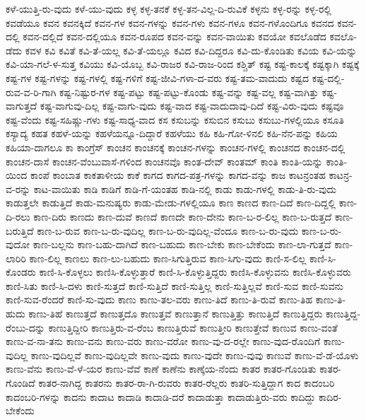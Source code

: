 {ಕಳೆ-ಯುತ್ತಿ-ರು-ವುದು
ಕಳೆ-ಯು-ವುದು
ಕಳ್ಳ
ಕಳ್ಳ-ತನಕೆ
ಕಳ್ಳ-ತನ-ವಿಲ್ಲ-ದಿ-ರುವಿಕೆ
ಕಳ್ಳನು
ಕಳ್ಳ-ರನ್ನು
ಕಳ್ಳ-ರಲ್ಲಿ
ಕವಡೆಯೂ
ಕವನ
ಕವನಕ್ಕಿದೆ
ಕವನ-ಗಳ
ಕವನ-ಗಳನ್ನು
ಕವನ-ಗಳು
ಕವನ-ಗಳೂ
ಕವನ-ಗಳೊಂದಿಗೂ
ಕವನದ
ಕವನ-ದಲ್ಲಿ
ಕವನ-ದಲ್ಲಿದೆ
ಕವನ-ದಲ್ಲಿಯೂ
ಕವನ-ರೂಪದ
ಕವನ-ವನ್ನು
ಕವನ-ವಾಯಿತು
ಕವಯೋ
ಕವಲೊಡೆದ
ಕವಲೊ-ಡೆದು
ಕವಳ
ಕವಿ
ಕವಿತೆ
ಕವಿ-ತೆ-ಯಲ್ಲ
ಕವಿ-ತೆ-ಯಲ್ಲೂ
ಕವಿದ
ಕವಿ-ದಿದ್ದರೂ
ಕವಿ-ದು-ಕೊಂಡಿತು
ಕವಿಯ
ಕವಿ-ಯನ್ನು
ಕವಿ-ಯಾ-ಗಲೆ-ಳ-ಸುತ್ತ
ಕವಿಯು
ಕವಿ-ಯೊಬ್ಬ
ಕವಿ-ರಾಜರ
ಕವಿ-ರಾಜ-ರಿಂದ
ಕಶ್ಚಿತ್
ಕಷ್ಟ
ಕಷ್ಟ-ಕಾಲಕ್ಕೆ
ಕಷ್ಟಕ್ಕಾಗಿ
ಕಷ್ಟಕ್ಕೆ
ಕಷ್ಟ-ಗಳ
ಕಷ್ಟ-ಗಳನ್ನು
ಕಷ್ಟ-ಗಳಲ್ಲಿ
ಕಷ್ಟ-ಗಳಿಗೆ
ಕಷ್ಟ-ಜೀವಿ-ಗಳಾ-ದ-ವರು
ಕಷ್ಟ-ತಮ-ವಾದುದು
ಕಷ್ಟದ
ಕಷ್ಟ-ದಲ್ಲಿ-ರುವ-ವ-ರಿ-ಗಾಗಿ
ಕಷ್ಟ-ನಿಷ್ಟುರ-ಗಳ
ಕಷ್ಟ-ಪಟ್ಟು
ಕಷ್ಟ-ಪಟ್ಟು-ಕೊಂಡು
ಕಷ್ಟ-ವನ್ನು
ಕಷ್ಟ-ವಲ್ಲ
ಕಷ್ಟ-ವಾಗಿತ್ತು
ಕಷ್ಟ-ವಾಗುತ್ತದೆ
ಕಷ್ಟ-ವಾಗುವು-ದಿಲ್ಲ
ಕಷ್ಟ-ವಾಗು-ವುದು
ಕಷ್ಟ-ವಾದ
ಕಷ್ಟ-ವಾದುದಾವು-ದಿದೆ
ಕಷ್ಟ-ವಿರು-ವುದು
ಕಷ್ಟವೂ
ಕಷ್ಟ-ವೆಂದು
ಕಷ್ಟ-ಸಹಿಷ್ಣು-ಗಳು
ಕಷ್ಟ-ಸಾಧ್ಯ-ವಾದ
ಕಸ
ಕಸುಬನ್ನು
ಕಸುಬಿನ
ಕಸುಬು
ಕಸುಬು-ಗಳಲ್ಲಿಯೂ
ಕಸೂತಿ
ಕಸ್ಯಾದ್ಯ
ಕಹತ
ಕಹಳೆ-ಯನ್ನು
ಕಹಳೆಯನ್ನೂ-ದಿದ್ದಾರೆ
ಕಹಳೆಯು
ಕಹಿ
ಕಹಿ-ಗೋ-ಳಿನಲಿ
ಕಹಿ-ನೆನ-ಪನ್ನು
ಕಹಿಯ
ಕಹಿಯಾ-ದಾಗಲೂ
ಕಾ
ಕಾಂಗ್ರೆಸ್
ಕಾಂಚನ
ಕಾಂಚನಕ್ಕೆ
ಕಾಂಚನ-ಗಳನ್ನು
ಕಾಂಚನ-ಗಳಲ್ಲಿ
ಕಾಂಚನದ
ಕಾಂಚನ-ದಲ್ಲಿ
ಕಾಂಚನ-ದಾಸೆ
ಕಾಂಚನ-ವೆಂಬುವಾಸೆ-ಗಳಿಂದ
ಕಾಂಚನವೊ
ಕಾಂತ-ದೇವ್
ಕಾಂತಮ್
ಕಾಂತಿ
ಕಾಂತಿ-ಯನ್ನು
ಕಾಂತಿ-ಯಿಂದ
ಕಾಂಪೆ
ಕಾಂಬಾತ
ಕಾಕತಾಳೀಯ
ಕಾಕೆ
ಕಾಗದ
ಕಾಗದ-ಪತ್ರ-ಗಳನ್ನು
ಕಾಗದ-ವನ್ನು
ಕಾಜ
ಕಾಟನ್ರಂತಹ
ಕಾಟನ್ರ-ವ-ರನ್ನು
ಕಾಟ-ವಾಯಿತು
ಕಾಡಿ
ಕಾಡಿಗೆ
ಕಾಡಿ-ಗೆ-ಯಂತಹ
ಕಾಡಿ-ನಲ್ಲಿ
ಕಾಡು
ಕಾಡು-ಗಳಲ್ಲಿ
ಕಾಡು-ತಿ-ರು-ವುದು
ಕಾಡುತ್ತಲೇ
ಕಾಡುತ್ತಿದೆ
ಕಾಡು-ಮನುಷ್ಯರು
ಕಾಡು-ಮೇಡು-ಗಳಲ್ಲಿಯೂ
ಕಾಣ
ಕಾಣದ
ಕಾಣ-ದಿದೆ
ಕಾಣ-ದಿದ್ದಲ್ಲಿ
ಕಾಣ-ದಿ-ರಲು
ಕಾಣ-ದಿರು
ಕಾಣದು
ಕಾಣ-ದುವೆ
ಕಾಣದೆ
ಕಾಣದೇ
ಕಾಣ-ದೇನು
ಕಾಣ-ಬ-ರ-ಲಿಲ್ಲ
ಕಾಣ-ಬ-ರುತ್ತದೆ
ಕಾಣ-ಬರುತ್ತಿದೆ
ಕಾಣ-ಬ-ರುವ
ಕಾಣ-ಬ-ರು-ವುದಿಲ್ಲ
ಕಾಣ-ಬ-ರು-ವುದಿಲ್ಲ-ವೆಂದೂ
ಕಾಣ-ಬ-ರು-ವುದು
ಕಾಣ-ಬ-ರು-ವುದೋ
ಕಾಣ-ಬಲ್ಲನು
ಕಾಣ-ಬಹು-ದಾಗಿದೆ
ಕಾಣ-ಬಹುದು
ಕಾಣ-ಬೇಕು
ಕಾಣ-ಬೇಕೆಂದು
ಕಾಣ-ಲಾ-ಗುತ್ತದೆ
ಕಾಣ-ಲಾರಿರಿ
ಕಾಣ-ಲಿಲ್ಲ
ಕಾಣಲು
ಕಾಣ-ಲು-ಬಹುದು
ಕಾಣ-ಸಿಗುತ್ತಿರುವ
ಕಾಣ-ಸಿಗು-ವುದು
ಕಾಣಿ-ಸ-ಲಿಲ್ಲ
ಕಾಣಿ-ಸಿ-ಕೊಂಡರು
ಕಾಣಿ-ಸಿ-ಕೊಳ್ಳಲು
ಕಾಣಿಸಿ-ಕೊಳ್ಳುತ್ತಾರೆ
ಕಾಣಿ-ಸಿ-ಕೊಳ್ಳುತ್ತಿದ್ದರು
ಕಾಣಿಸಿ-ಕೊಳ್ಳುವನು
ಕಾಣಿಸಿ-ಕೊಳ್ಳುವರು
ಕಾಣಿ-ಸಿತು
ಕಾಣಿ-ಸಿ-ದಳು
ಕಾಣಿ-ಸುತ್ತದೆ
ಕಾಣಿ-ಸುತ್ತಿದೆ
ಕಾಣಿ-ಸುತ್ತಿಲ್ಲ
ಕಾಣಿ-ಸುತ್ತಿಲ್ಲವೆ
ಕಾಣಿ-ಸುವ
ಕಾಣಿ-ಸುವನು
ಕಾಣಿ-ಸುವ-ರೆಂದರೆ
ಕಾಣಿ-ಸು-ವುದು
ಕಾಣು
ಕಾಣು-ತಲ-ವರು
ಕಾಣು-ತಿದೆ
ಕಾಣು-ತಿ-ರುವೆ
ಕಾಣು-ತಿಹ
ಕಾಣು-ತಿ-ಹುದು
ಕಾಣು-ತಿಹೆ
ಕಾಣುತ್ತದೆ
ಕಾಣುತ್ತದೊ
ಕಾಣುತ್ತವೆ
ಕಾಣುತ್ತಾನೆ
ಕಾಣುತ್ತಿತ್ತು
ಕಾಣುತ್ತಿದೆ
ಕಾಣುತ್ತಿದ್ದರು
ಕಾಣುತ್ತಿದ್ದ-ರೆಂಬು-ದನ್ನು
ಕಾಣುತ್ತಿದ್ದೀರಿ
ಕಾಣುತ್ತಿರು-ವ-ರೆಂಬ
ಕಾಣುತ್ತಿರುವೆ
ಕಾಣುತ್ತೀರಿ
ಕಾಣುತ್ತೇವೆ
ಕಾಣುವ
ಕಾಣು-ವಂತೆ
ಕಾಣು-ವ-ನಾ-ತನು
ಕಾಣು-ವನು
ಕಾಣು-ವರು
ಕಾಣು-ವರೋ
ಕಾಣು-ವು-ದ-ರಲ್ಲೇ
ಕಾಣು-ವುದ-ರೊಂದಿಗೆ
ಕಾಣು-ವುದಿಲ್ಲ
ಕಾಣು-ವುದಿಲ್ಲವೆ
ಕಾಣು-ವುದಿಲ್ಲವೇ
ಕಾಣು-ವುದು
ಕಾಣು-ವುದೇ
ಕಾಣು-ವುವು
ಕಾಣುವೆ
ಕಾಣು-ವೆ-ಡೆ-ಯೊಳು
ಕಾಣು-ವೆನು
ಕಾಣು-ವೆ-ಳೆ-ಯರ
ಕಾಣು-ವೆವೆ
ಕಾಣೆ
ಕಾಣೆನು
ಕಾಣ್ಕೆಯ-ನೆಂದು
ಕಾತರ
ಕಾತರ-ಗೊಂಡಿತು
ಕಾತರ-ಗೊಂಡಿದೆ
ಕಾತರ-ನಾಗಿದ್ದ
ಕಾತರನು
ಕಾತರ-ರಾ-ಗಿ-ರುವರು
ಕಾತರ-ರೆಲ್ಲರು
ಕಾತರಿ-ಸುತ್ತಿದ್ದಾಗ
ಕಾದ
ಕಾದಂಬರಿ
ಕಾದಂಬರಿ-ಗಳನ್ನು
ಕಾದನು
ಕಾದಾಟ
ಕಾದಾಡಿ
ಕಾದಾಡಿ-ದರೆ
ಕಾದಾಡುತ್ತಾ
ಕಾದಾಡುತ್ತಿರು-ವರು
ಕಾದಿದ್ದು
ಕಾದಿರ-ಬೇಕೆಂದು
}
